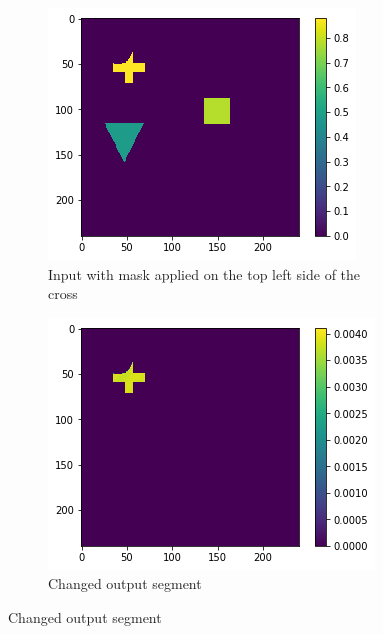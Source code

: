 \begin{figure}[H]
    \centering
    \begin{subfigure}[t]{.33\textwidth}
        \centering
        \includegraphics[width=\linewidth]{chapters/06_hdm/images_analyze/3a_masked.png}
        \caption{Input with mask applied on the top left side of the cross}
    \end{subfigure}%
    \begin{subfigure}[t]{.33\textwidth}
        \centering
        \includegraphics[width=\linewidth]{chapters/06_hdm/images_analyze/3b_segment.png}
        \caption{Changed output segment}
    \end{subfigure}

\end{figure}

